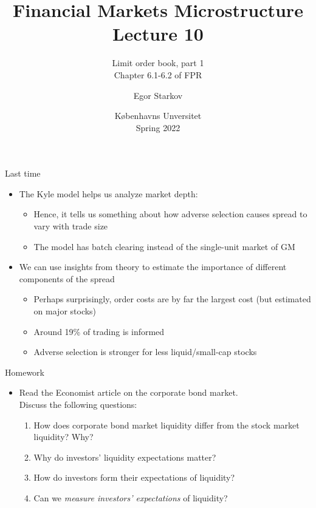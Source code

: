 \documentclass[english,10pt
,aspectratio=169
]{beamer}
\title{Financial Markets Microstructure \\ Lecture 10}
\subtitle{Limit order book, part 1\\
	Chapter 6.1-6.2 of FPR}
\author{Egor Starkov}
\date{K{\o}benhavns Unversitet \\
	Spring 2022}
\begin{document}
\frame[plain]{\titlepage}


\begin{frame}{Last time}
	\begin{itemize}
		\item The Kyle model helps us analyze market depth:
		\begin{itemize}
			\item Hence, it tells us something about how adverse selection causes spread to vary with trade size
			\item The model has batch clearing instead of the single-unit market of GM
		\end{itemize}
		\item We can use insights from theory to estimate the importance of different components of the spread
		\begin{itemize}
			\item Perhaps surprisingly, order costs are by far the largest cost (but estimated on major stocks)
			\item Around 19\% of trading is informed
			\item Adverse selection is stronger for less liquid/small-cap stocks
		\end{itemize}
	\end{itemize}
\end{frame}


\begin{frame}{Homework}
	\begin{itemize}
		\item Read the Economist article on the corporate bond market. 
		\\
		Discuss the following questions:
		\begin{enumerate}
			\item How does corporate bond market liquidity differ from the stock market liquidity? Why?
			\item Why do investors' liquidity expectations matter?
			\item How do investors form their expectations of liquidity?
			\item Can we \emph{measure investors' expectations} of liquidity?
		\end{enumerate}
	\end{itemize}
\end{frame}
\end{document}
